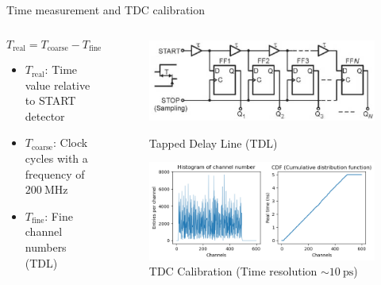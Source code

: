 \documentclass{ikpKoeln}
\begin{document}
\begin{frame}[t]{Time measurement and TDC calibration}
\begin{columns}
\begin{column}{0.45 \textwidth}
			\vspace{-0.5em}
			$$T_\text{real} = T_\text{coarse} - T_\text{fine}$$
			\vspace{-1em}
			\small
			{
				\begin{itemize}
					\item $T_\text{real}$: Time value relative to START detector
					\item $T_\text{coarse}$: Clock cycles with a frequency of $\qty{200}{\MHz}$
					\item $T_\text{fine}$: Fine channel numbers (TDL)
				\end{itemize}
			}
		\end{column}
		\begin{column}{0.5 \textwidth}
			\begin{figure}
				\captionsetup{labelformat=empty}
				\vspace{-0.8em}\includegraphics[width = \textwidth]{r3b/TDCFineTime}
				\caption{\scriptsize Tapped Delay Line (TDL)\footnotemark}
                \pause
				\includegraphics[width = \textwidth]{neuland/FineTimeCal}
				\caption{\scriptsize TDC Calibration (Time resolution $\sim \qty{10}{\pico\second}$)}
			\end{figure}
            \vspace{-1.3em}
            \let\thefootnote\relax{}
		\end{column}
	\end{columns}
\end{frame}
\end{document}
